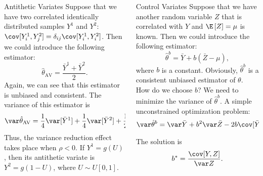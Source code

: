 \documentclass[]{beamer}
\begin{document}
\begin{frame}[t]
\begin{columns}[t]
\begin{column}{\twocolwid}
\begin{columns}[t,totalwidth=\twocolwid]
\begin{column}{\onecolwid}
    \begin{block}{Antithetic Variates}
        Suppose that we have two correlated identically distributed samples $Y^1$ and $Y^2$: $\cov[Y_i^1, Y_j^2] = \delta_{ij}\cov[Y_i^1, Y_i^2]$.
        Then we could introduce the following estimator:
        \begin{equation}
            \hat\theta_{\operatorname{AV}} = \frac{\bar Y^1 + \bar Y^2}{2}.
        \end{equation}
        Again, we can see that this estimator is unbiased and consistent. The variance of this estimator is
        \begin{equation*}
            \var \hat\theta_{\operatorname{AV}} = \frac{1}{4} \var[\bar Y^1] + \frac{1}{4} \var[\bar Y^2] + \frac{1}{2} \cov[\bar Y^1, \bar Y^2] .
        \end{equation*}
        Thus, the variance reduction effect takes place when $\rho < 0$. If $Y^1 = g(U)$, then its antithetic 
        variate is $Y^2 = g(1-U)$, where $U \sim U[0, 1]$. 
    \end{block}
    
    
    \end{column} %
    
    \begin{column}{\onecolwid} %
    
    
    \begin{block}{Control Variates}
        Suppose that we have another random variable $Z$ that is correlated with $Y$ and 
        $\E\left[Z\right] = \mu$ is known. Then we could introduce the following estimator:
        \begin{equation}
            \hat\theta^b = \bar Y + b(\bar Z - \mu),
        \end{equation}
        where $b$ is a constant. Obviously, $\hat\theta^b$ is a consistent unbiased estimator of 
        $\theta$. How do we choose $b$? We need to minimize the variance of $\hat\theta^b$. A simple 
        unconstrained optimization problem:
        \begin{equation*}
            \var \hat\theta^b = \var \bar Y + b^2 \var \bar Z - 2b \cov [\bar Y, \bar Z] \to \min_b.
        \end{equation*}
        The solution is
        \begin{equation}
            b^* = \frac{\cov [Y, Z]}{\var Z}.\label{eq:control_variates:bopt}
        \end{equation}
    

\end{block}
\end{column}
\end{columns}
\end{column}
\end{columns}
\end{frame}
\end{document}
